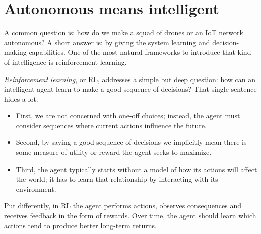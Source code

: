 \section{Autonomous means intelligent}
A common question is: how do we make a squad of drones or an IoT network autonomous? A short answer is: by giving the system learning and decision-making capabilities. One of the most natural frameworks to introduce that kind of intelligence is reinforcement learning.

\textit{Reinforcement learning}, or RL, addresses a simple but deep question: how can an intelligent agent learn to make a good sequence of decisions? That single sentence hides a lot. 
\begin{itemize}
    \item First, we are not concerned with one-off choices; instead, the agent must consider sequences where current actions influence the future. 
    \item Second, by saying a good sequence of decisions we implicitly mean there is some measure of utility or reward the agent seeks to maximize. 
    \item Third, the agent typically starts without a model of how its actions will affect the world; it has to learn that relationship by interacting with its environment.
\end{itemize}
Put differently, in RL the agent performs actions, observes consequences and receives feedback in the form of rewards. Over time, the agent should learn which actions tend to produce better long-term returns.

